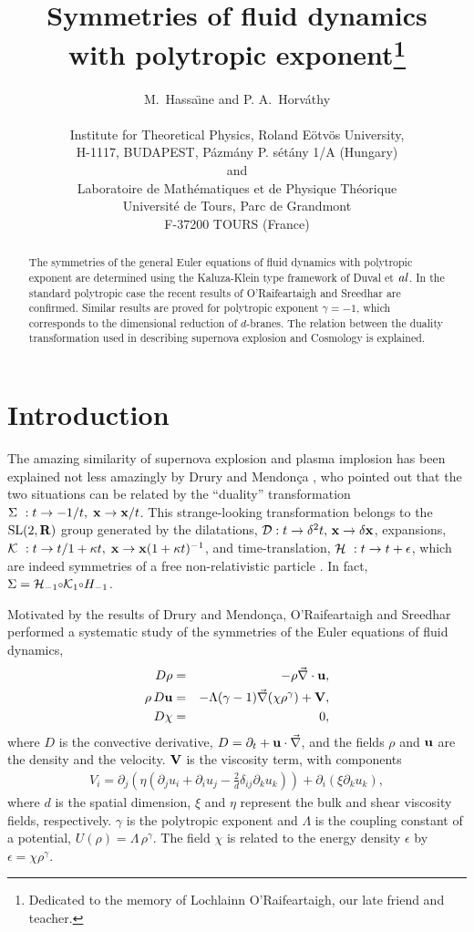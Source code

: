 \documentclass[11pt,a4paper]{article}
\title{Symmetries of fluid dynamics\\
with polytropic exponent\footnote{Dedicated to the memory of
Lochlainn O'Raifeartaigh, our late friend and teacher.}
\\
}
\author{M.~Hassa\"{\i}ne and P. A.~Horv\'athy\\
\\
Institute for Theoretical Physics, Roland E\"{o}tv\"{o}s
University,\\
H-1117, BUDAPEST, P\'azm\'any P. s\'et\'any 1/A (Hungary)
\\
and
\\
Laboratoire de Math\'ematiques et de Physique Th\'eorique\\
Universit\'e de Tours, Parc de Grandmont\\
F-37200 TOURS (France)\\
}
\let\ssection=\section
\renewcommand{\section}{\setcounter{equation}{0}\ssection}
\def\D{{\cal D}}
\def\K{{\cal K}}
\def\H{{\cal H}}
\def\IR{{\bf R}}
\def\smallcirc{{\raise 0.5pt \hbox{$\scriptstyle\circ$}}}
\begin{document}
\maketitle
\begin{abstract}
The symmetries of the general Euler equations of fluid dynamics with
polytropic exponent are determined using the Kaluza-Klein
type framework of Duval et $\it{al}$.
In the standard polytropic case the recent results of O'Raifeartaigh
and Sreedhar are confirmed. Similar
results are proved for
 polytropic exponent $\gamma=-1$, which corresponds to
the dimensional reduction of $d$-branes.
The relation between the duality transformation used in describing
supernova explosion and Cosmology is explained.
\end{abstract}


\section{Introduction}

The amazing similarity of supernova explosion and plasma implosion
has been explained not less amazingly by Drury and
Mendon\c ca \cite{DM}, who pointed out that the two situations
 can be related by the ``duality'' transformation
$
\Sigma~: t\to -1/t,\; {\bf x}\to {\bf x}/t$.
This strange-looking transformation
belongs to the ${\rm SL}(2,\IR)$  group generated by
the
dilatations, $\D:t\to \delta^2t,\, {\bf x}\to \delta{\bf x}$,
expansions,
$\K~: t\to t/1+\kappa t,\; {\bf x}\to{\bf x}(1+\kappa t)^{-1}$,
 and time-translation, ${\cal H}~:t\to t+\epsilon$,
which are indeed symmetries of a free non-relativistic particle
\cite{NH, DGH}. In fact, $\Sigma=\H_{-1}\smallcirc \K_{1}\smallcirc
H_{-1}$.


Motivated by the results of Drury and Mendon\c ca, O'Raifeartaigh
and Sreedhar \cite{RS}
performed a systematic study of the symmetries of the Euler equations
of fluid dynamics,
\begin{eqnarray}
 D\rho & = &-\rho\vec{\nabla}\cdot{\bf u},\\
\rho\, D{\bf u} & = &-\Lambda(\gamma-1)\vec{\nabla}(\chi
\rho^{\gamma})+{\bf V},\\
D\chi & = &0,
\label{eulergeneral}
\end{eqnarray}
where $D$ is the convective derivative,
$D=\partial_t+{\bf u}\cdot\vec{\nabla}$, and the fields $\rho$ and
${\bf u}$ are the density and the velocity. ${\bf V}$ is
the viscosity term, with components
\begin{eqnarray}
V_i=\partial_j\left(\eta\left(\partial_j u_i+\partial_iu_j
-\frac{2}{d}\delta_{ij}\partial_k u_k\right)\right)+\partial_i
\left(\xi\partial_k u_k\right),
\label{viscosityterms}
\end{eqnarray}
where  $d$ is the spatial dimension,
$\xi$ and $\eta$ represent the bulk  and shear viscosity fields,
respectively.  $\gamma$ is the polytropic exponent and
 $\Lambda$ is the coupling constant of a
potential, $U(\rho)=\Lambda\, \rho^{\gamma}$. The field $\chi$ is
related to the energy density $\epsilon$ by $\epsilon=\chi\rho^{\gamma}$.
\end{document}

